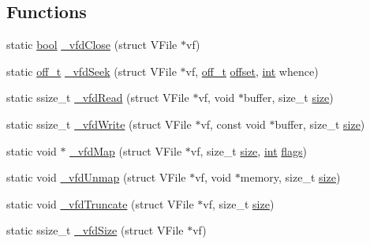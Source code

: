 \subsection*{Functions}
\begin{DoxyCompactItemize}
\item 
static \mbox{\hyperlink{libretro_8h_a4a26dcae73fb7e1528214a068aca317e}{bool}} \mbox{\hyperlink{vfs-fd_8c_afe7a343ac521b428d98e41710a96e584}{\+\_\+vfd\+Close}} (struct V\+File $\ast$vf)
\item 
static \mbox{\hyperlink{__builder_8h_a53066be3c3a28d8b8ccb3dc95c1e49b1}{off\+\_\+t}} \mbox{\hyperlink{vfs-fd_8c_a61523db03b21435b98c34ed1d783bbc9}{\+\_\+vfd\+Seek}} (struct V\+File $\ast$vf, \mbox{\hyperlink{__builder_8h_a53066be3c3a28d8b8ccb3dc95c1e49b1}{off\+\_\+t}} \mbox{\hyperlink{ioapi_8h_a601c4660e8a1a14a1b87fe387e934d19}{offset}}, \mbox{\hyperlink{ioapi_8h_a787fa3cf048117ba7123753c1e74fcd6}{int}} whence)
\item 
static ssize\+\_\+t \mbox{\hyperlink{vfs-fd_8c_a4d32fae21137dfbf535bcc4a0212d862}{\+\_\+vfd\+Read}} (struct V\+File $\ast$vf, void $\ast$buffer, size\+\_\+t \mbox{\hyperlink{ioapi_8h_a014d89bd76f74ef3a29c8f04b473eb76}{size}})
\item 
static ssize\+\_\+t \mbox{\hyperlink{vfs-fd_8c_a9f8dcc1c16660034ac0746b80f9c0c21}{\+\_\+vfd\+Write}} (struct V\+File $\ast$vf, const void $\ast$buffer, size\+\_\+t \mbox{\hyperlink{ioapi_8h_a014d89bd76f74ef3a29c8f04b473eb76}{size}})
\item 
static void $\ast$ \mbox{\hyperlink{vfs-fd_8c_a12d1697e3d7ebc27c66cb2bfb5d8b025}{\+\_\+vfd\+Map}} (struct V\+File $\ast$vf, size\+\_\+t \mbox{\hyperlink{ioapi_8h_a014d89bd76f74ef3a29c8f04b473eb76}{size}}, \mbox{\hyperlink{ioapi_8h_a787fa3cf048117ba7123753c1e74fcd6}{int}} \mbox{\hyperlink{lr35902_2decoder_8c_a11f29eea941556f0630cfd3285f565c0}{flags}})
\item 
static void \mbox{\hyperlink{vfs-fd_8c_a4e580a8cc60f9640c03ed89a67da646d}{\+\_\+vfd\+Unmap}} (struct V\+File $\ast$vf, void $\ast$memory, size\+\_\+t \mbox{\hyperlink{ioapi_8h_a014d89bd76f74ef3a29c8f04b473eb76}{size}})
\item 
static void \mbox{\hyperlink{vfs-fd_8c_a3ea37b047d1a73e301cc14c70f7e232e}{\+\_\+vfd\+Truncate}} (struct V\+File $\ast$vf, size\+\_\+t \mbox{\hyperlink{ioapi_8h_a014d89bd76f74ef3a29c8f04b473eb76}{size}})
\item 
static ssize\+\_\+t \mbox{\hyperlink{vfs-fd_8c_a104ce2895f52876ad1c5583560b0e65f}{\+\_\+vfd\+Size}} (struct V\+File $\ast$vf)
\item 

\end{DoxyCompactItemize}
